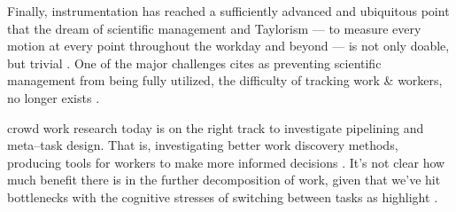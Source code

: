 \documentclass[trackingWork]{subfiles}
\begin{document}
Finally, instrumentation has reached a sufficiently advanced and ubiquitous point that
the dream of scientific management and Taylorism
--- to measure every motion at every point throughout the workday and beyond ---
is not only doable, but trivial
\cite{waltz2012quantified}.
One of the major challenges \citeauthor{10.2307/23702539} cites as
preventing scientific management from being fully utilized,
the difficulty of tracking work \& workers, no longer exists
\cite{10.2307/23702539}.


\subsubsubsection{\implication}
crowd work research today is on the right track to investigate pipelining and meta--task design.
That is, investigating better work discovery methods, producing tools for workers to make more informed decisions
\cite[see, for example,][]{turkopticon}.
It's not clear how much benefit there is in the further decomposition of work,
given that we've hit bottlenecks with the cognitive stresses of switching between tasks
as \citeauthor{delayAndOrderLasecki} highlight
\cite{delayAndOrderLasecki}.
\end{document}
